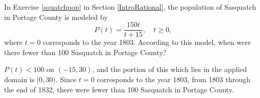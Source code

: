 \documentclass{ximera}
\begin{document}
\begin{problem}
In Exercise \ref{squatchpop} in Section \ref{IntroRational}, the population of Sasquatch in Portage County is modeled by  \[P(t) = \frac{150t}{t + 15}, \quad t \geq 0,\] where $t = 0$ corresponds to the year 1803.  According to this model, when were there fewer than 100 Sasquatch in Portage County?

\begin{solution}
     $P(t) < 100$ on $(-15, 30)$, and the portion of this which lies in the applied domain is $[0,30)$.  Since $t=0$ corresponds to the year 1803, from 1803 through the end of 1832, there were fewer than 100 Sasquatch in Portage County.
\end{solution}
\end{problem}
\end{document}
